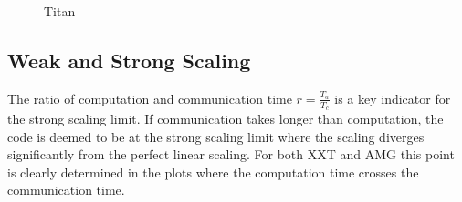 \documentclass{sig-alternate}
\begin{document}
\begin{figure}
{  }
\caption{Titan}
\label{fig:scaling_titan}
\end{figure}



\subsection{Weak and Strong Scaling}

The ratio of computation and communication time $r=\frac{T_a}{T_c}$ is a key
indicator for the strong scaling limit. If communication takes longer than
computation, the code is deemed to be at the strong scaling limit where the
scaling diverges significantly from the perfect linear scaling. For both XXT and
AMG this point is clearly determined in the plots where the computation time
crosses the communication time. 
\end{document}
